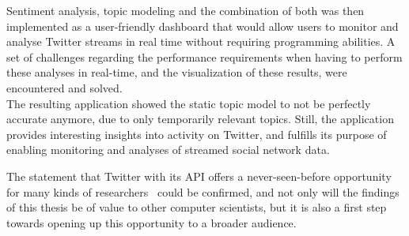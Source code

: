 Sentiment analysis, topic modeling and the combination of both was then implemented as a user-friendly dashboard that would
allow users to monitor and analyse Twitter streams in real time without requiring programming abilities.
A set of challenges regarding the performance requirements when having to perform these analyses in real-time,
and the visualization of these results, were encountered and solved.\\
The resulting application showed the static topic model to not be perfectly accurate anymore,
due to only temporarily relevant topics.
Still, the application provides interesting insights into activity on Twitter,
and fulfills its purpose of enabling monitoring and analyses of streamed social network data.

The statement that Twitter with its API offers a never-seen-before opportunity for
many kinds of researchers~\cite{Kwak2010} could be confirmed,
and not only will the findings of this thesis be of value to other computer scientists,
but it is also a first step towards opening up this opportunity to a broader audience.
